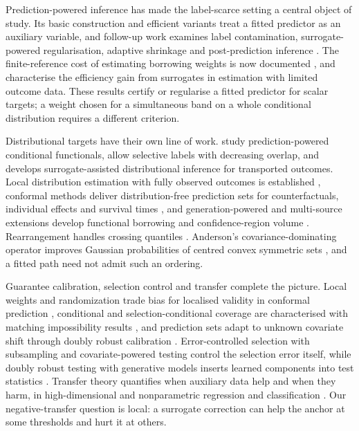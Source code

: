 Prediction-powered inference has made the label-scarce setting a central object of study. Its basic construction and efficient variants \citep{AngelopoulosEtAl2023,AngelopoulosDuchiZrnic2023,ZrnicCandes2024} treat a fitted predictor as an auxiliary variable, and follow-up work examines label contamination, surrogate-powered regularisation, adaptive shrinkage and post-prediction inference \citep{SesiaEtAl2025,JiLeiZrnic2025,ChenEtAl2025,LiIgnatiadis2025,MiaoEtAl2025}. The finite-reference cost of estimating borrowing weights is now documented \citep{mani2025nofreelunch,Eyre2025}, and \citet{KallusMao2025} characterise the efficiency gain from surrogates in estimation with limited outcome data. These results certify or regularise a fitted predictor for scalar targets; a weight chosen for a simultaneous band on a whole conditional distribution requires a different criterion.

Distributional targets have their own line of work. \citet{SuiEtAl2026} study prediction-powered conditional functionals, \citet{TestaEtAl2025} allow selective labels with decreasing overlap, and \citet{Wang2026} develops surrogate-assisted distributional inference for transported outcomes. Local distribution estimation with fully observed outcomes is established \citep{CattaneoJanssonMa2024,CattaneoEtAl2024}, conformal methods deliver distribution-free prediction sets for counterfactuals, individual effects and survival times \citep{LeiCandes2021,CandesLeiRen2023}, and generation-powered and multi-source extensions develop functional borrowing and confidence-region volume \citep{zhang2026generation,li2026multisource}. Rearrangement handles crossing quantiles \citep{ChernozhukovEtAl2010}. Anderson's covariance-dominating operator improves Gaussian probabilities of centred convex symmetric sets \citep{Anderson1955}, and a fitted path need not admit such an ordering.

Guarantee calibration, selection control and transfer complete the picture. Local weights and randomization trade bias for localised validity in conformal prediction \citep{HoreBarber2025}, conditional and selection-conditional coverage are characterised with matching impossibility results \citep{GibbsEtAl2025,JinRen2025}, and prediction sets adapt to unknown covariate shift through doubly robust calibration \citep{QiuEtAl2023,YangEtAl2024}. Error-controlled selection with subsampling \citep{ShahSamworth2013} and covariate-powered testing \citep{IgnatiadisHuber2021} control the selection error itself, while doubly robust testing with generative models inserts learned components into test statistics \citep{ZhangEtAl2026}. Transfer theory quantifies when auxiliary data help and when they harm, in high-dimensional and nonparametric regression and classification \citep{LiCaiLi2022,GuHanDuan2025,AuddyEtAl2026}. Our negative-transfer question is local: a surrogate correction can help the anchor at some thresholds and hurt it at others.

